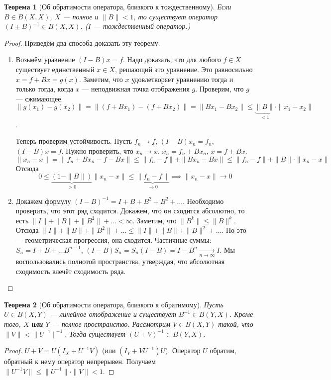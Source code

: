 \documentclass[11pt,openany,a4paper]{scrartcl}
\theoremstyle{plain}
\newtheorem{theorem}{Теорема}[section]
\theoremstyle{definition}
\newcommand{\underto}[1]{\xrightarrow[#1]{}}
\begin{document}
\begin{theorem}[Об обратимости оператора, близкого к тождественному]
    Если $B \in B(X, X)$, $X$ — полное и  $\|B\| < 1$, то существует оператор
    $(I \pm B)^{-1} \in B(X, X)$. ($I$ — тождественный оператор.)
\end{theorem}
\begin{proof}
    Приведём два способа доказать эту теорему.
    \begin{enumerate}
        \item Возьмём уравнение $(I-B)x = f$. Надо доказать, что для любого
        $f \in X$ существует единственный $x \in X$, решающий это уравнение.
        Это равносильно $x = f + Bx = g(x)$. Заметим, что $x$ удовлетворяет
        уравнению тогда и только тогда, когда $x$ — неподвижная точка отображения
        $g$. Проверим, что $g$ — сжимающее.
        $\|g(x_1) - g(x_2)\| = \|(f + Bx_1) - (f + Bx_2)\| =
        \|Bx_1 - Bx_2\| \leqslant \underbrace{\|B\|}_{< 1} \cdot \|x_1 - x_2\|$.
        
        Теперь проверим устойчивость. Пусть $f_n \to f$, $(I-B)x_n = f_n$,
        $(I-B)x=f$. Нужно проверить, что $x_n \to x$. $x_n = f_n + Bx_n$,
        $x = f + Bx$.
        $$
        \|x_n - x\| = \|f_n + Bx_n - f - Bx\| \leqslant \|f_n - f\| +
        \|Bx_n - Bx\| \leqslant \|f_n - f\| + \|B\|\cdot \|x_n - x\|
        $$
        Отсюда
        $$
        0 \leqslant \underbrace{(1 - \|B\|)}_{>0}\|x_n - x\|\leqslant
        \underbrace{\|f_n - f\|}_{\to 0} \implies
        \|x_n - x\| \to 0
        $$
        \item Докажем формулу $(I - B)^{-1} = I + B + B^2 + B^2 + \ldots$.
        Необходимо проверить, что этот ряд сходится. Докажем, что он
        сходится абсолютно, то есть $\|I\| + \|B\| + \|B^2\| + \ldots < \infty$.
        Заметим, что $\|B^k\| \leqslant \|B\|^k$. Отсюда
        $\|I\| + \|B\| + \|B^2\| + \ldots \leqslant
        \|I\| + \|B\| + \|B\|^2 + \ldots$. Но это — геометрическая прогрессия,
        она сходится.
        Частичные суммы: $S_n = I + B + \ldots B^{n-1}$,
        $(I - B)S_n = S_n(I-B) = I - B^n \underto{n \to \infty} I$.
        Мы воспользовались полнотой пространства, утверждая, что абсолютная
        сходимость влечёт сходимость ряда.
    \end{enumerate}
\end{proof}

\begin{theorem}[Об обратимости оператора, близкого к обратимому]
    Пусть $U \in B(X, Y)$ — линейное отображение и существует $B^{-1}\in B(Y, X)$.
    Кроме того, $X$ \textbf{или} $Y$ — полное пространство.
    Рассмотрим $V\in B(X, Y)$ такой, что $\|V\| < \|U^{-1}\|^{-1}$. Тогда
    существует $(U + V)^{-1} \in B(Y, X)$.
\end{theorem}
\begin{proof}
    $U + V = U(I_X + U^{-1}V)$ (или $(I_Y + VU^{-1})U$).
    Оператор $U$ обратим, обратный к нему оператор
    непрерывен. Получаем $\|U^{-1}V\|\leqslant\|U^{-1}\|\cdot\|V\| < 1$.
\end{proof}
\end{document}
